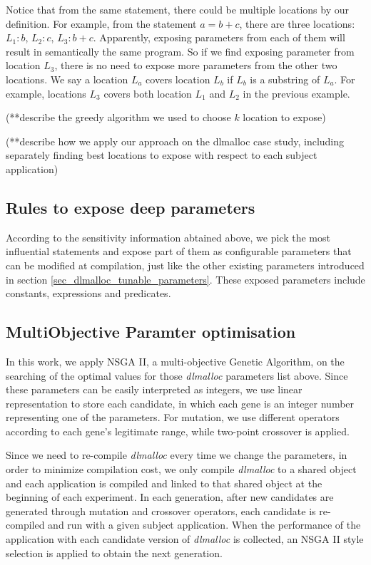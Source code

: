 Notice that from the same statement, there could be multiple locations by our definition. For example, from the statement $a=b+c$, there are three locations: $L_1:b$, $L_2:c$, $L_3:b+c$. Apparently, exposing parameters from each of them will result in semantically the same program. So if we find exposing parameter from location $L_3$, there is no need to expose more parameters from the other two locations. We say a location $L_a$ covers location $L_b$ if $L_b$ is a substring of $L_a$. For example, locations $L_3$ covers both location $L_1$ and $L_2$ in the previous example. 

(**describe the greedy algorithm we used to choose $k$ location to expose)

(**describe how we apply our approach on the dlmalloc case study, including separately finding best locations to expose with respect to each subject application)

\subsection{Rules to expose deep parameters}

According to the sensitivity information abtained above, we pick the most influential statements and expose part of them as configurable parameters that can be modified at compilation, just like the other existing parameters introduced in section \ref{sec_dlmalloc_tunable_parameters}. These exposed parameters include constants, expressions and predicates. 



\subsection{MultiObjective Paramter optimisation}
\label{sec_nsgaii}
In this work, we apply NSGA II\cite{996017}, a multi-objective Genetic Algorithm, on the searching of the optimal values for those \emph{dlmalloc} parameters list above.
Since these parameters can be easily interpreted as integers, we use linear representation to store each candidate, in which each gene is an integer number representing one of the parameters. For mutation, we use different operators according to each gene's legitimate range, while two-point crossover is applied.

Since we need to re-compile \emph{dlmalloc} every time we change the parameters, in order to minimize compilation cost, we only compile \emph{dlmalloc} to a shared object and each application is compiled and linked to that shared object at the beginning of each experiment. In each generation, after new candidates are generated through mutation and crossover operators, each candidate is re-compiled and run with a given subject application. When the performance of the application with each candidate version of \emph{dlmalloc} is collected, an NSGA II style selection is applied to obtain the next generation.

